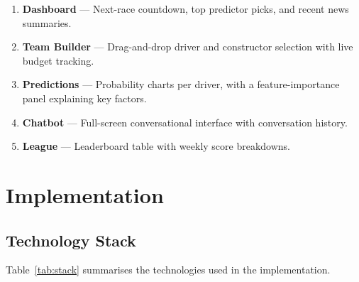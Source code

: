\documentclass[12pt, a4paper, oneside]{report}
\begin{document}
\begin{enumerate}[leftmargin=*]
  \item \textbf{Dashboard} --- Next-race countdown, top predictor picks, and
        recent news summaries.
  \item \textbf{Team Builder} --- Drag-and-drop driver and constructor selection
        with live budget tracking.
  \item \textbf{Predictions} --- Probability charts per driver, with a
        feature-importance panel explaining key factors.
  \item \textbf{Chatbot} --- Full-screen conversational interface with
        conversation history.
  \item \textbf{League} --- Leaderboard table with weekly score breakdowns.
\end{enumerate}

\chapter{Implementation}

\section{Technology Stack}

Table~\ref{tab:stack} summarises the technologies used in the implementation.
\end{document}
